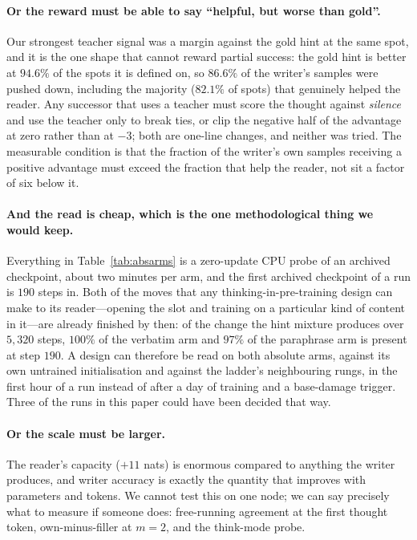 \documentclass{article} %
\begin{document}
\paragraph{Or the reward must be able to say ``helpful, but worse than gold''.} Our strongest teacher signal was a margin against the gold hint at the same spot, and it is the one shape that cannot reward partial success: the gold hint is better at $94.6\%$ of the spots it is defined on, so $86.6\%$ of the writer's samples were pushed down, including the majority ($82.1\%$ of spots) that genuinely helped the reader. Any successor that uses a teacher must score the thought against \emph{silence} and use the teacher only to break ties, or clip the negative half of the advantage at zero rather than at $-3$; both are one-line changes, and neither was tried. The measurable condition is that the fraction of the writer's own samples receiving a positive advantage must exceed the fraction that help the reader, not sit a factor of six below it.

\paragraph{And the read is cheap, which is the one methodological thing we would keep.} Everything in Table~\ref{tab:absarms} is a zero-update CPU probe of an archived checkpoint, about two minutes per arm, and the first archived checkpoint of a run is $190$ steps in. Both of the moves that any thinking-in-pre-training design can make to its reader---opening the slot and training on a particular kind of content in it---are already finished by then: of the change the hint mixture produces over $5{,}320$ steps, $100\%$ of the verbatim arm and $97\%$ of the paraphrase arm is present at step $190$. A design can therefore be read on both absolute arms, against its own untrained initialisation and against the ladder's neighbouring rungs, in the first hour of a run instead of after a day of training and a base-damage trigger. Three of the runs in this paper could have been decided that way.

\paragraph{Or the scale must be larger.} The reader's capacity ($+11$ nats) is enormous compared to anything the writer produces, and writer accuracy is exactly the quantity that improves with parameters and tokens. We cannot test this on one node; we can say precisely what to measure if someone does: free-running agreement at the first thought token, own-minus-filler at $m=2$, and the think-mode probe.
\end{document}
